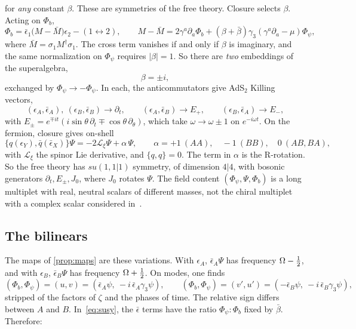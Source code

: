 for \emph{any} constant $\beta$. These are symmetries of the free theory. Closure selects $\beta$. Acting on $\Phi_b$,
\begin{equation}
[\delta_1,\delta_2]\Phi_b=\bar\epsilon_1\big(M-\bar M\big)\epsilon_2-(1\leftrightarrow2),\qquad M-\bar M=2\gamma^a\partial_a\Phi_b+(\beta+\bar\beta)\gamma_3(\gamma^a\partial_a-\mu)\Phi_\psi,
\end{equation}
where $\bar M=\sigma_1M^\dagger\sigma_1$. The cross term vanishes if and only if $\beta$ is imaginary, and the same normalization on $\Phi_\psi$ requires $|\beta|=1$. So there are \emph{two} embeddings of the superalgebra,
\begin{equation}
\beta=\pm i,
\end{equation}
exchanged by $\Phi_\psi\to-\Phi_\psi$. In each, the anticommutators give AdS$_2$ Killing vectors,
\begin{equation}\label{eq:vectors}
(\epsilon_A,\bar\epsilon_A),\ (\epsilon_B,\bar\epsilon_B)\to\partial_t,\qquad(\epsilon_A,\bar\epsilon_B)\to E_+,\qquad(\epsilon_B,\bar\epsilon_A)\to E_-,
\end{equation}
with $E_\pm=e^{\mp it}(i\sin\theta\,\partial_t\mp\cos\theta\,\partial_\theta)$, which take $\omega\to\omega\pm1$ on $e^{-i\omega t}$. On the fermion, closure gives on-shell
\begin{equation}\label{eq:closure-psi}
\{q(\epsilon_Y),\bar q(\bar\epsilon_X)\}\Psi=-2\mathcal L_\xi\Psi+\alpha\,\Psi,\qquad\alpha=+1\ (AA),\quad-1\ (BB),\quad0\ (AB,BA),
\end{equation}
with $\mathcal L_\xi$ the spinor Lie derivative, and $\{q,q\}=0$. The term in $\alpha$ is the R-rotation. So the free theory has $su(1,1|1)$ symmetry, of dimension $4|4$, with bosonic generators $\partial_t,E_\pm,J_0$, where $J_0$ rotates $\Psi$. The field content $(\Phi_\psi,\Psi,\Phi_b)$ is a long multiplet with real, neutral scalars of different masses, not the chiral multiplet with a complex scalar considered in~\cite{Correa:2019rdk}.

\subsection{The bilinears}

The maps of \cref{prop:maps} are these variations. With $\epsilon_A$, $\bar\epsilon_A\Psi$ has frequency $\Omega-\tfrac12$, and with $\epsilon_B$, $\bar\epsilon_B\Psi$ has frequency $\Omega+\tfrac12$. On modes, one finds
\begin{equation}\label{eq:bilinears}
(\Phi_b,\Phi_\psi)=(u,v)=(\bar\epsilon_A\psi,\ -i\,\bar\epsilon_A\gamma_3\psi),\qquad(\Phi_b,\Phi_\psi)=(v',u')=(-\bar\epsilon_B\psi,\ -i\,\bar\epsilon_B\gamma_3\psi),
\end{equation}
stripped of the factors of $\zeta$ and the phases of time. The relative sign differs between $A$ and $B$. In~\eqref{eq:susy}, the $\bar\epsilon$ terms have the ratio $\Phi_\psi:\Phi_b$ fixed by $\bar\beta$. Therefore:

